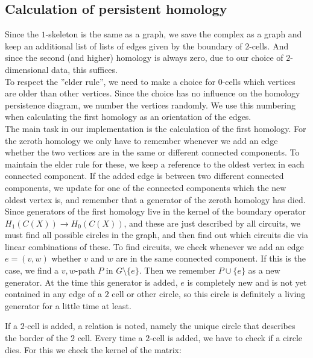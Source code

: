 \documentclass[11pt, a4paper, UKenglish]{article}
\begin{document}
    \subsection{Calculation of persistent homology}\label{subsec:calculation-of-persistent-homology}

    Since the $1$-skeleton is the same as a graph, we save the complex as a graph and keep an additional list of lists of edges given by the boundary of $2$-cells.
    And since the second (and higher) homology is always zero, due to our choice of $2$-dimensional data, this suffices.\\
    To respect the ''elder rule'', we need to make a choice for $0$-cells which vertices are older than other vertices.
    Since the choice has no influence on the homology persistence diagram, we number the vertices randomly.
    We use this numbering when calculating the first homology as an orientation of the edges.\\
    The main task in our implementation is the calculation of the first homology.
    For the zeroth homology we only have to remember whenever we add an edge whether the two vertices are in the same or different connected components.
    To maintain the elder rule for these, we keep a reference to the oldest vertex in each connected component.
    If the added edge is between two different connected components, we update for one of the connected components which the new oldest vertex is, and remember that a generator of the zeroth homology has died.\\
    Since generators of the first homology live in the kernel of the boundary operator $H_1(C(X))\rightarrow H_0(C(X))$, and these are just described by all circuits, we must find all possible circles in the graph, and then find out which circuits die via linear combinations of these.
    To find circuits, we check whenever we add an edge $e=(v,w)$ whether $v$ and $w$ are in the same connected component.
    If this is the case, we find a $v,w$-path $P$ in $G\setminus \{e\}$.
    Then we remember $P\cup \{e\}$ as a new generator.
    At the time this generator is added, $e$ is completely new and is not yet contained in any edge of a $2$ cell or other circle, so this circle is definitely a living generator for a little time at least.

    If a $2$-cell is added, a relation is noted, namely the unique circle that describes the border of the $2$ cell.
    Every time a $2$-cell is added, we have to check if a circle dies.
    For this we check the kernel of the matrix:
\end{document}
